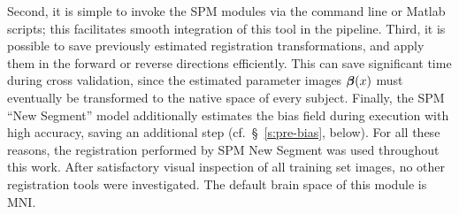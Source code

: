 Second, it is simple to invoke the SPM modules via the command line or Matlab scripts;
this facilitates smooth integration of this tool in the pipeline.
Third, it is possible to save previously estimated registration transformations,
and apply them in the forward or reverse directions efficiently.
This can save significant time during cross validation,
since the estimated parameter images $\bm{\beta}(x)$ must eventually be transformed
to the native space of every subject.
Finally, the SPM ``New Segment'' model additionally estimates the bias field during execution
with high accuracy, saving an additional step (cf.~\S~\ref{s:pre-bias}, below). 
For all these reasons, the registration performed by SPM New Segment was used throughout this work.
After satisfactory visual inspection of all training set images,
no other registration tools were investigated.
The default brain space of this module is MNI.
